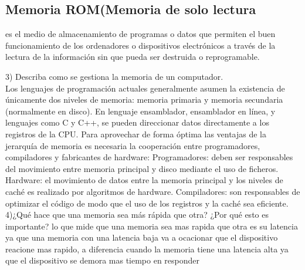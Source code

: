 \documentclass{article}
\begin{document}
\subsection*{Memoria ROM(Memoria de solo lectura}
es el medio de almacenamiento de programas o datos que permiten el buen funcionamiento de los ordenadores o dispositivos electrónicos a través de la lectura de la información sin que pueda ser destruida o reprogramable.

3) Describa como se gestiona la memoria de un computador.\\[0.1cm]
Los lenguajes de programación actuales generalmente asumen la existencia de únicamente dos niveles de memoria: memoria primaria y memoria secundaria (normalmente en disco). En lenguaje ensamblador, ensamblador en línea, y lenguajes como C y C++, se pueden direccionar datos directamente a los registros de la CPU.
Para aprovechar de forma óptima las ventajas de la jerarquía de memoria es necesaria la cooperación entre programadores, compiladores y fabricantes de hardware:
Programadores: deben ser responsables del movimiento entre memoria principal y disco mediante el uso de ficheros.
Hardware: el movimiento de datos entre la memoria principal y los niveles de caché es realizado por algoritmos de hardware.
Compiladores: son responsables de optimizar el código de modo que el uso de los registros y la caché sea eficiente.\\[0.1cm]

4)¿Qué hace que una memoria sea más rápida que otra? ¿Por qué esto es importante?
lo que mide que una memoria sea mas rapida que otra es su latencia ya que una memoria con una  latencia baja va a ocacionar que el dispositivo reacione mas rapido, a diferencia  cuando la  memoria tiene una latencia alta ya que el dispositivo se demora mas tiempo en responder
\end{document}
